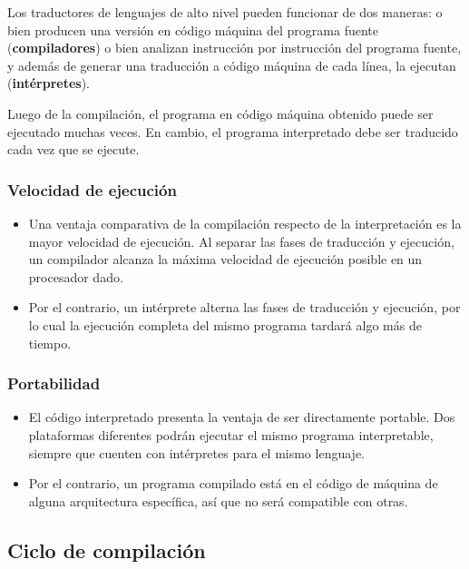 \documentclass[spanish,a4paper,]{article}
\providecommand{\tightlist}{%
  \setlength{\itemsep}{0pt}\setlength{\parskip}{0pt}}
\begin{document}
Los traductores de lenguajes de alto nivel pueden funcionar de dos
maneras: o bien producen una versión en código máquina del programa
fuente (\textbf{compiladores}) o bien analizan instrucción por
instrucción del programa fuente, y además de generar una traducción a
código máquina de cada línea, la ejecutan (\textbf{intérpretes}).

Luego de la compilación, el programa en código máquina obtenido puede
ser ejecutado muchas veces. En cambio, el programa interpretado debe ser
traducido cada vez que se ejecute.

\hypertarget{velocidad-de-ejecuciuxf3n}{%
\subsubsection{Velocidad de ejecución}\label{velocidad-de-ejecuciuxf3n}}

\begin{itemize}
\tightlist
\item
  Una ventaja comparativa de la compilación respecto de la
  interpretación es la mayor velocidad de ejecución. Al separar las
  fases de traducción y ejecución, un compilador alcanza la máxima
  velocidad de ejecución posible en un procesador dado.
\item
  Por el contrario, un intérprete alterna las fases de traducción y
  ejecución, por lo cual la ejecución completa del mismo programa
  tardará algo más de tiempo.
\end{itemize}

\hypertarget{portabilidad}{%
\subsubsection{Portabilidad}\label{portabilidad}}

\begin{itemize}
\tightlist
\item
  El código interpretado presenta la ventaja de ser directamente
  portable. Dos plataformas diferentes podrán ejecutar el mismo programa
  interpretable, siempre que cuenten con intérpretes para el mismo
  lenguaje.
\item
  Por el contrario, un programa compilado está en el código de máquina
  de alguna arquitectura específica, así que no será compatible con
  otras.
\end{itemize}

\hypertarget{ciclo-de-compilaciuxf3n}{%
\subsection{Ciclo de compilación}\label{ciclo-de-compilaciuxf3n}}
\end{document}
